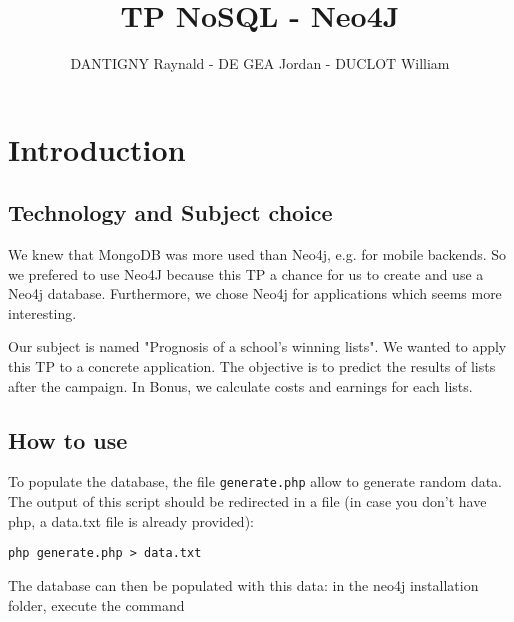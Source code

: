 \documentclass[a4paper,oneside,1pt]{article}
\title{TP NoSQL - Neo4J}
\author{DANTIGNY Raynald - DE GEA Jordan - DUCLOT William}
\begin{document}





\maketitle

\section{Introduction}

\subsection{Technology and Subject choice}

We knew that MongoDB was more used than Neo4j, e.g. for mobile backends. So we prefered to use Neo4J because this TP a chance for us to create and use a Neo4j database.  Furthermore, we chose Neo4j for applications which seems more interesting. 
\linebreak

Our subject is named "Prognosis of a school's winning lists". We wanted to apply this TP to a concrete application. The objective is to predict the results of lists after the campaign. In Bonus, we calculate costs and earnings for each lists. 

\subsection{How to use}

To populate the database, the file \texttt{generate.php} allow to generate random data. The output of this script should be redirected in a file (in case you don't have php, a data.txt file is already provided):

\texttt{php generate.php > data.txt}

The database can then be populated with this data: in the neo4j installation folder, execute the command
\end{document}
